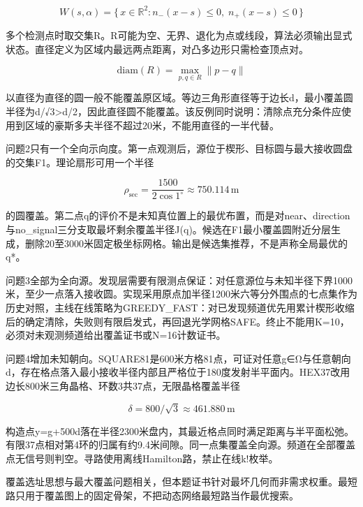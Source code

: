 \documentclass[UTF8,12pt,a4paper,fontset=none]{ctexart}
\begin{document}
\begin{equation}
W(s,\alpha)=\{\,x\in\mathbb{R}^{2}: n_{-}(x-s)\le 0,\; n_{+}(x-s)\le 0\,\}
\label{eq-wedge}
\end{equation}

多个检测点时取交集R。R可能为空、无界、退化为点或线段，算法必须输出显式状态。直径定义为区域内最远两点距离，对凸多边形只需检查顶点对。

\begin{equation}
\mathrm{diam}(R)=\max_{p,q\in R}\|p-q\|
\label{eq-diam}
\end{equation}

以直径为直径的圆一般不能覆盖原区域。等边三角形直径等于边长d，最小覆盖圆半径为d/√3>d/2，因此直径圆不能覆盖。该反例同时说明：清除点充分条件应使用到区域的豪斯多夫半径不超过20米，不能用直径的一半代替。

问题2只有一个全向示向度。第一点观测后，源位于楔形、目标圆与最大接收圆盘的交集F1。理论扇形可用一个半径

\begin{equation}
\rho_{\mathrm{sec}}=\frac{1500}{2\cos 1^{\circ}}\approx 750.114\,\mathrm{m}
\label{eq-sector-rho}
\end{equation}

的圆覆盖。第二点q的评价不是未知真位置上的最优布置，而是对near、direction与no\_signal三分支取最坏剩余覆盖半径J(q)。候选在F1最小覆盖圆附近分层生成，删除20至3000米固定极坐标网格。输出是候选集推荐，不是声称全局最优的q*。

问题3全部为全向源。发现层需要有限测点保证：对任意源位与未知半径下界1000米，至少一点落入接收圆。实现采用原点加半径1200米六等分外围点的七点集作为历史对照，主线在线策略为GREEDY\_FAST：对已发现频道优先用累计楔形收缩后的确定清除，失败则有限启发式，再回退光学网格SAFE。终止不能用K=10，必须对未观测频道给出覆盖证书或N=16计数证书。

问题4增加未知朝向。SQUARE81是600米方格81点，可证对任意g∈Ω与任意朝向d，存在格点落入最小接收半径内部且严格位于180度发射半平面内。HEX37改用边长800米三角晶格、环数3共37点，无限晶格覆盖半径

\begin{equation}
\delta=800/\sqrt{3}\approx 461.880\,\mathrm{m}
\label{eq-hex-delta}
\end{equation}

构造点y=g+500d落在半径2300米盘内，其最近格点同时满足距离与半平面松弛。有限37点相对第4环的归属有约9.4米间隙。同一点集覆盖全向源。频道在全部覆盖点无信号则判空。寻路使用离线Hamilton路，禁止在线k!枚举。

覆盖选址思想与最大覆盖问题相关，但本题证书针对最坏几何而非需求权重。最短路只用于覆盖图上的固定骨架，不把动态网络最短路当作最优搜索。
\end{document}
